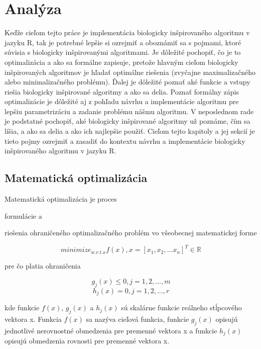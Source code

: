 ﻿\newpage
\chapter{Analýza}
\label{ch:Analýza}

Keďže cieľom tejto práce je implementácia biologicky inšpirovaného algoritmu v jazyku R, tak je potrebné lepšie si ozrejmiť a oboznámiť sa s pojmami, ktoré súvisia s biologicky inšpirovanými algoritmami. Je dôležité pochopiť, čo je to optimalizácia a ako sa formálne zapisuje, pretože hlavným cieľom biologicky inšpirovaných algoritmov je hľadať optimálne riešenia (zvyčajne maximalizačného alebo minimalizačného problému). Ďalej je dôležité poznať aké funkcie a vstupy riešia biologicky inšpirované algoritmy a ako sa delia. Poznať formálny zápis optimalizácie je dôležité aj z pohľadu návrhu a implementácie algoritmu pre lepšiu parametrizáciu a zadanie problému nášmu algoritmu. V neposlednom rade je podstatné pochopiť, aké biologicky inšpirované algoritmy už poznáme, čím sa líšia, a ako sa delia a ako ich najlepšie použiť.
Cieľom tejto kapitoly a jej sekcií je tieto pojmy ozrejmiť a zasadiť do kontextu návrhu a implementácie biologicky inšpirovaného algoritmu v jazyku R.

\section{Matematická optimalizácia}
\label{ch:Matematická optimalizácia}
Matematická optimalizácia je proces
\begin{my_itemize}
 \item formulácie a
 \item riešenia ohraničeného optimalizačného problém vo všeobecnej matematickej forme
\end{my_itemize}

\begin{equation}  
    minimize_{w.r.t. x} f(x), x = [x_1, x_2, ... x_n]^T \in \mathbb{R}
\end{equation}

pre čo platia ohraničenia

\begin{equation}
g_j(x) ≤ 0, j= 1, 2, . . . , m
\end{equation}
\begin{equation}
h_j(x) = 0, j= 1, 2, . . . , r
\end{equation}

kde funkcie \(f(x)\), \(g_j(x)\) a \(h_j(x)\) sú skalárne funkcie
reálneho stĺpcového vektora x. Funkcia \(f(x)\) sa nazýva cieľová funkcia, funkcie \(g_j(x)\) opisujú jednotlivé nerovnostné obmedzenia pre premenné vektora x a funkcie \(h_j(x)\) opisujú obmedzenia rovnosti pre premenné vektora x.

